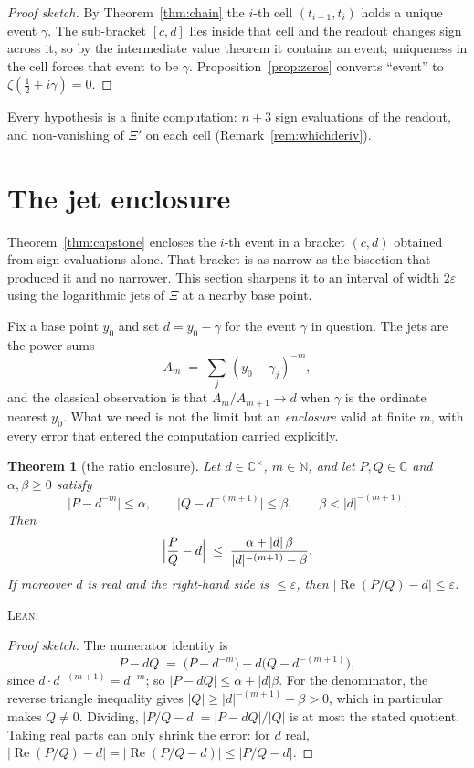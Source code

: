 \documentclass[11pt]{article}
\theoremstyle{plain}
\newtheorem{theorem}{Theorem}
\theoremstyle{definition}
\theoremstyle{remark}
\newcommand{\C}{\mathbb{C}}
\newcommand{\N}{\mathbb{N}}
\newcommand{\leanref}[1]{%
  \par\nobreak\vspace{2pt}%
  {\footnotesize\raggedright\noindent\textsc{Lean:}~\texttt{\detokenize{#1}}\par}%
  \vspace{2pt}}
\begin{document}
\begin{proof}[Proof sketch]
By Theorem~\ref{thm:chain} the $i$-th cell $(t_{i-1},t_i)$ holds a unique event
$\gamma$. The sub-bracket $[c,d]$ lies inside that cell and the readout changes sign
across it, so by the intermediate value theorem it contains an event; uniqueness in
the cell forces that event to be $\gamma$. Proposition~\ref{prop:zeros} converts
``event'' to $\zeta(\tfrac12+i\gamma)=0$.
\end{proof}

\noindent
Every hypothesis is a finite computation: $n+3$ sign evaluations of the readout, and
non-vanishing of $\Xi'$ on each cell (Remark~\ref{rem:whichderiv}).

\section{The jet enclosure}\label{sec:jets}

Theorem~\ref{thm:capstone} encloses the $i$-th event in a bracket $(c,d)$ obtained
from sign evaluations alone. That bracket is as narrow as the bisection that produced
it and no narrower. This section sharpens it to an interval of width $2\varepsilon$
using the logarithmic jets of $\Xi$ at a nearby base point.

Fix a base point $y_0$ and set $d=y_0-\gamma$ for the event $\gamma$ in question. The
jets are the power sums
\[
  A_m\;=\;\sum_{j}\,(y_0-\gamma_j)^{-m},
\]
and the classical observation is that $A_m/A_{m+1}\to d$ when $\gamma$ is the ordinate
nearest $y_0$. What we need is not the limit but an \emph{enclosure} valid at finite
$m$, with every error that entered the computation carried explicitly.

\begin{theorem}[the ratio enclosure]\label{thm:ratio}
Let $d\in\C^{\times}$, $m\in\N$, and let $P,Q\in\C$ and $\alpha,\beta\ge0$ satisfy
\[
  \bigl\lvert P-d^{-m}\bigr\rvert\le\alpha,\qquad
  \bigl\lvert Q-d^{-(m+1)}\bigr\rvert\le\beta,\qquad
  \beta<\lvert d\rvert^{-(m+1)} .
\]
Then
\[
  \Bigl\lvert \frac{P}{Q}-d \Bigr\rvert
  \;\le\;\frac{\alpha+\lvert d\rvert\,\beta}{\lvert d\rvert^{-(m+1)}-\beta}.
\]
If moreover $d$ is real and the right-hand side is $\le\varepsilon$, then
$\lvert\operatorname{Re}(P/Q)-d\rvert\le\varepsilon$.
\end{theorem}
\leanref{ratio_enclosure, re_enclosure}

\begin{proof}[Proof sketch]
The numerator identity is
\[
  P-dQ\;=\;\bigl(P-d^{-m}\bigr)-d\bigl(Q-d^{-(m+1)}\bigr),
\]
since $d\cdot d^{-(m+1)}=d^{-m}$; so
$\lvert P-dQ\rvert\le\alpha+\lvert d\rvert\beta$. For the denominator, the reverse
triangle inequality gives
$\lvert Q\rvert\ge\lvert d\rvert^{-(m+1)}-\beta>0$, which in particular makes $Q\ne0$.
Dividing, $\lvert P/Q-d\rvert=\lvert P-dQ\rvert/\lvert Q\rvert$ is at most the stated
quotient. Taking real parts can only shrink the error: for $d$ real,
$\lvert\operatorname{Re}(P/Q)-d\rvert=\lvert\operatorname{Re}(P/Q-d)\rvert
\le\lvert P/Q-d\rvert$.
\end{proof}
\end{document}
